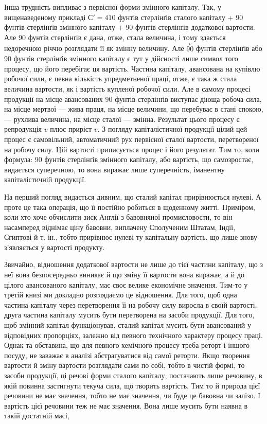 Інша трудність випливає з первісної форми змінного капіталу.
Так, у вищенаведеному прикладі $С' = 410$ фунтів стерлінґів сталого
капіталу + 90 фунтів стерлінґів змінного капіталу + 90 фунтів
стерлінґів додаткової вартости. Але 90 фунтів стерлінґів
є дана, отже, стала величина, і тому здається недоречною річчю
розглядати її як змінну величину. Але $\overset{v}{90}$ фунтів стерлінґів або
90 фунтів стерлінґів змінного капіталу є тут у дійсності лише
символ того процесу, що його перебігає ця вартість. Частина
капіталу, авансована на купівлю робочої сили, є певна кількість
упредметненої праці, отже, є така ж стала величина вартости,
як і вартість купленої робочої сили. Але в самому процесі продукції
на місце авансованих 90 фунтів стерлінґів виступає діюща
робоча сила, на місце мертвої — жива праця, на місце величини,
що перебуває в стані спокою, — рухлива величина, на місце сталої
— змінна. Результат цього процесу є репродукція $v$ плюс
приріст $v$. З погляду капіталістичної продукції цілий цей процес
є самовільний, автоматичний рух первісної сталої вартости,
перетвореної на робочу силу. Цій вартості приписується процес
і його результат. Тим то, коли формула: 90 фунтів стерлінґів
змінного капіталу, або вартість, що самозростає, видається суперечною,
то вона виражає лише суперечність, іманентну капіталістичній
продукції.

На перший погляд видається дивним, що сталий капітал
прирівнюється нулеві. А проте це така операція, що її постійно
робиться в щоденному житті. Приміром, коли хто хоче обчислити
зиск Англії з бавовняної промисловости, то він насамперед віднімає
ціну бавовни, виплачену Сполученим Штатам, Індії, Єгиптові
й т. ін., тобто прирівнює нулеві ту капітальну вартість, що
лише знову з’являється у вартості продукту.

Звичайно, відношення додаткової вартости не лише до тієї
частини капіталу, що з неї вона безпосередньо виникає й що зміну
її вартости вона виражає, а й до цілого авансованого капіталу,
має своє велике економічне значення. Тим-то у третій книзі ми
докладно розглядаємо це відношення. Для того, щоб одна частина
капіталу через перетворення її на робочу силу виросла в своїй
вартості, друга частина капіталу мусить бути перетворена на
засоби продукції. Для того, щоб змінний капітал функціонував,
сталий капітал мусить бути авансований у відповідних пропорціях,
залежно від певного технічного характеру процесу праці.
Однак та обставина, що для певного хемічного процесу треба
реторт і іншого посуду, не заважає в аналізі абстрагуватися від
самої реторти. Якщо творення вартости й зміну вартости розглядати
сами по собі, тобто в чистій формі, то засоби продукції, ці
речові форми сталого капіталу, постачають лише речовину, в
якій повинна застигнути текуча сила, що творить вартість. Тим
то й природа цієї речовини не має значення, тобто не має значення,
чи буде це бавовна чи залізо. І вартість цієї речовини теж не має
значення. Вона лише мусить бути наявна в такій достатній масі,
\parbreak{}  %
